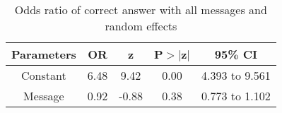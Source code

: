 \begin{table}[htbp]
\centering
\caption{Odds ratio of correct answer with all messages and random effects} 
\label{ormesgre}
\begin{tabular}{ccccc}
  \toprule
Parameters & OR & z & P$>$$|$z$|$ & 95\% CI \\ 
  \midrule
Constant & 6.48 & 9.42 & 0.00 & 4.393 to 9.561 \\ 
  Message & 0.92 & -0.88 & 0.38 & 0.773 to 1.102 \\ 
   \bottomrule
\end{tabular}
\end{table}
